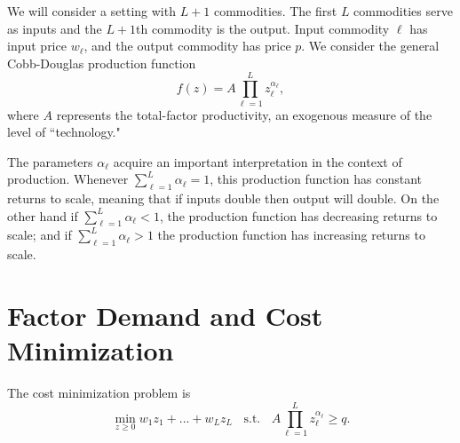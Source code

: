 \documentclass[12pt]{article}
\theoremstyle{definition}
\begin{document}
\maketitle
\onehalfspace



We will consider a setting with $L+1$ commodities. The first $L$ commodities serve as inputs and the $L+1$th commodity is the output. Input commodity $\ell$ has input price $w_{\ell}$, and the output commodity has price $p$. We consider the general Cobb-Douglas production function
	\[	f(z)=A \prod_{{\ell}=1}^L z_{\ell}^{\alpha_{\ell}},\]
where $A$ represents the total-factor productivity, an exogenous measure of the level of ``technology."

The parameters $\alpha_{\ell}$ acquire an important interpretation in the context of production. Whenever $\sum_{\ell = 1}^L \alpha_{\ell} = 1$, this production function has constant returns to scale, meaning that if inputs double then output will double. On the other hand if $\sum_{\ell = 1}^L \alpha_{\ell} < 1$, the production function has decreasing returns to scale; and if $\sum_{\ell = 1}^L \alpha_{\ell} > 1$ the production function has increasing returns to scale.


\section{Factor Demand and Cost Minimization}
The cost minimization problem is
	\[	\min_{z \geq 0} w_1z_1 + ... + w_{L}z_{L}  \;\; \text{ s.t. } \;\; A \prod_{\ell = 1}^{L} z_{\ell}^{\alpha_{\ell}} \geq q. \]		
    
    
\end{document}
